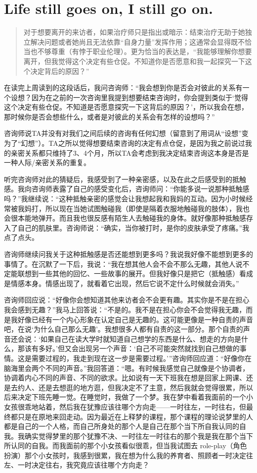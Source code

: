 \chapter{Life still goes on, I still go on.}


\blockquote{
    对于想要离开的来访者，如果治疗师只是指出或暗示：结束治疗无助于她独立解决问题或者她尚且无法依靠“自身力量”发挥作用；这通常会显得既不恰当也不够尊重（有悖于职业伦理）。更为恰当的表达是，“我能够理解你想要离开，但我觉得这个决定有些仓促。不知道你是否愿意和我一起探究一下这个决定背后的原因？”
}

在读完上周读到的这段话后，我问咨询师：“我会想到你是否会对彼此的关系有一个设想？因为在之前的一次咨询里我提到想要结束咨询时，你会提到类似于‘觉得这个决定有些仓促。不知道是否愿意探究一下这背后的原因？’，所以我会在想，那时候你是否会想些什么，或者是对彼此的关系会有怎样的设想吗？”

咨询师说TA并没有对我们之间后续的咨询有任何幻想（留意到了用词从“设想”变为了“幻想”）。TA之所以觉得想要结束咨询的决定有点仓促，是因为我之前说过我的亲密关系都只维持了3、4个月，所以TA会考虑到我决定结束咨询这本身是否是一种人际/亲密关系的重复。

听完咨询师对此的猜疑后，我感受到了一种亲密感，以及在此之后感受到的抵触感。我向咨询师表露了自己的感受变化后，咨询师问：“你能多说一说那种抵触感吗？”我继续说：“这种抵触亲密的感觉会让我想起我和我妈的互动。因为小时候经常被我妈打，所以现在当她试图触碰我（即使是隔着衣服地触碰我的肢体），我也会很本能地弹开。而且我也很反感有陌生人去触碰我的身体。就好像那种抵触感存入了自己的肌肤里。咨询师说：“确实，当你被打时，是你的皮肤承受了疼痛。”我点了点头。

咨询师继续问我关于这种抵触感是否还能想到更多吗？我说我好像不能想到更多的事情了。在沉默了一下后，我说：“我在想其他人会不会不那么无趣，其他人说不定能联想到一些其他的回忆、一些故事的展开。但我好像只是把它（抵触感）看成是情感本身。情感出现了，就看着它出现，然后它说不定什么时候就会消失。”

咨询师回应说：“好像你会想知道其他来访者会不会更有趣。其实你是不是在担心我会感到无趣？”我马上回答说：“不是的。我不是在担心你会不会觉得我无趣，而是我好像已经有一个内心形象在认定自己是无趣的。这可能更像是一种自责的声音吧，在说‘为什么自己那么无趣’。我想很多人都有自责的这一部分。那个自责的声音还会说：‘如果自己在读大学时就知道自己想学的东西是什么、想走的方向是什么，那该有多好。’但又会出现另一个声音：‘自己不可能突然就找到自己想做的事情。这是需要过程的，我走到现在这一步是需要过程。’”咨询师回应道：“好像你在脑海里会两个不同的声音。”我回答道：“嗯。有时候我感觉自己就像是个协调者，协调着内心不同的声音、不同的欲求。比如说有一天下班我在想是回家上网课、还是去约人、还是去想逛的地方逛，但我决定不了主意，然后我就会觉得很累，所以后来决定下班先睡一觉。在睡觉时，我做了一个梦。我在梦中看着我面前的一个小女孩很乖地站着，然后我在犹豫应该往哪个方向走——一时往左，一时往右，但最终都只是在原地来回走动。因为最近在上释梦的课程，那个课程的理论说梦里的人都是自己的一个人格，而自己所身处的那个人是自己在那个当下所自我认同的自我。我确实觉得梦里的那个犹豫不决、一时往左一时往右的那个我是我在那个当下所认同的自我。而我面前的那个小女孩看似很乖，但当我试图去 role-play（角色扮演）那个小女孩时，我感到很累，我在想为什么我的养育者、照顾者一时决定往左、一时决定往右，我究竟应该往哪个方向走？

